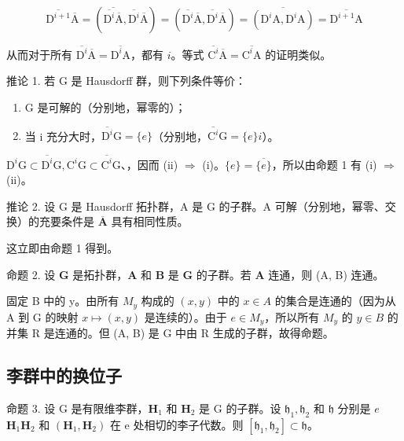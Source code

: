 \[
\overline{\mathrm{D}^{i+1}}\overline{\mathrm{A}} = (\overline{\overline{\mathrm{D}^{i}}\overline{\mathrm{A}}},\overline{\mathrm{D}^{i}}\overline{\mathrm{A}}) = (\overline{\mathrm{D}^{i}}\overline{\mathrm{A}},\overline{\mathrm{D}^{i}}\overline{\mathrm{A}}) = \overline{(\mathrm{D}^{i}\mathrm{A},\mathrm{D}^{i}\mathrm{A})} = \overline{\mathrm{D}^{i+1}\mathrm{A}}
\]

从而对于所有 \(\overline{\mathrm{D}^{i}}\overline{\mathrm{A}} = \overline{\mathrm{D}^{i}\mathrm{A}}\)，都有 \(i\)。等式 \(\overline{\mathrm{C}^{i}}\overline{\mathrm{A}} = \overline{\mathrm{C}^{i}\mathrm{A}}\) 的证明类似。

推论 1. 若 G 是 Hausdorff 群，则下列条件等价：

\begin{enumerate}
\def\labelenumi{(\roman{enumi})}
\item
  G 是可解的（分别地，幂零的）；
\item
  当 i 充分大时，\(\overline{\mathrm{D}^{i}}\mathrm{G} = \{e\}\)（分别地，\(\overline{\mathrm{C}^{i}}\mathrm{G} = \{e\}\)\(i\)）。
\end{enumerate}

\(\mathrm{D}^{i}\mathrm{G} \subset \overline{\mathrm{D}^{i}}\mathrm{G}, \mathrm{C}^{i}\mathrm{G} \subset \overline{\mathrm{C}^{i}}\mathrm{G}\)、，因而 (ii) \(\Rightarrow\) (i)。\(\{e\} = \overline{\{e\}}\)，所以由命题 1 有 (i) \(\Rightarrow\) (ii)。

推论 2. 设 G 是 Hausdorff 拓扑群，A 是 G 的子群。A 可解（分别地，幂零、交换）的充要条件是 \(\overline{\mathbf{A}}\) 具有相同性质。

这立即由命题 1 得到。

命题 2. 设 \(\mathbf{G}\) 是拓扑群，\(\mathbf{A}\) 和 \(\mathbf{B}\) 是 \(\mathbf{G}\) 的子群。若 \(\mathbf{A}\) 连通，则 (A, B) 连通。

固定 B 中的 y。由所有 \(M_{y}\) 构成的 \((x,y)\) 中的 \(x \in A\) 的集合是连通的（因为从 A 到 G 的映射 \(x \mapsto (x,y)\) 是连续的）。由于 \(e \in M_{y}\)，所以所有 \(M_{y}\) 的 \(y \in B\) 的并集 R 是连通的。但 (A, B) 是 G 中由 R 生成的子群，故得命题。

\subsection{李群中的换位子}

命题 3. 设 G 是有限维李群，\(\mathbf{H}_1\) 和 \(\mathbf{H}_2\) 是 G 的子群。设 \(\mathfrak{h}_1, \mathfrak{h}_2\) 和 \(\mathfrak{h}\) 分别是 \(e\)\(\mathbf{H}_1\mathbf{H}_2\) 和 \((\mathbf{H}_1,\mathbf{H}_2)\) 在 e 处相切的李子代数。则 \([\mathfrak{h}_1,\mathfrak{h}_2] \subset \mathfrak{h}\)。

